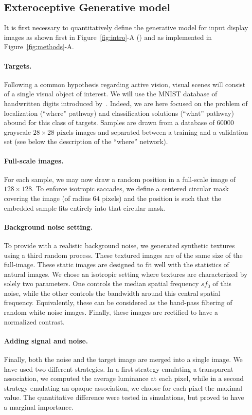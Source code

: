 \subsection{Exteroceptive Generative model}
It is first necessary to quantitatively define the generative model for input display images as shown first in Figure~\ref{fig:intro}-A (\DIS ) and as implemented in Figure~\ref{fig:methods}-A. 

\paragraph{Targets.} Following a common hypothesis regarding active vision, visual scenes will consist of a single visual object of interest. We will use the MNIST database of handwritten digits introduced by~\citep{Lecun1998}. Indeed, we are here focused on the problem of localization (``where'' pathway) and classification solutions (``what'' pathway) abound for this class of targets. Samples are drawn from a database of $60000$ grayscale $28\times 28$ pixels images and separated between a training and a validation set (see below the description of the ``where'' network). 
\paragraph{Full-scale images.} For each sample, we may now draw a random position in a full-scale image of $128\times 128$. To enforce isotropic saccades, we define a centered circular mask covering the image (of radius $64$ pixels) and the position is such that the embedded sample fits entirely into that circular mask.
\paragraph{Background noise setting. } To provide with a realistic background noise, we generated synthetic textures~\citep{Sanz12} using a third random process. These textured images are of the same size of the full-image. These static images are designed to fit well with the statistics of natural images. We chose an isotropic setting where textures are characterized by solely two parameters. One controls the median spatial frequency $sf_0$ of this noise, while the other controls the bandwidth around this central spatial frequency. Equivalently, these can be considered as the band-pass filtering of random white noise images. Finally, these images are rectified to have a normalized contrast.
\paragraph{Adding signal and noise. } Finally, both the noise and the target image are merged into a single image. We have used two different strategies. In a first strategy emulating a transparent association, we computed the average luminance at each pixel, while in a second strategy emulating an opaque association, we choose for each pixel the maximal value. The quantitative difference were tested in simulations, but proved to have a marginal importance.
%
